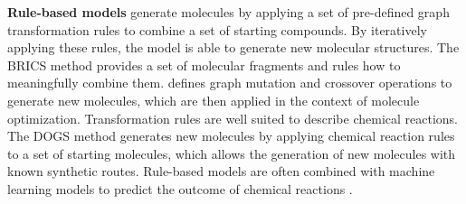 \textbf{Rule-based models} generate molecules by applying a set of pre-defined graph transformation
rules to combine a set of starting compounds. By iteratively applying these rules, the model is able
to generate new molecular structures. The BRICS \citep{degenArtCompilingUsing2008} method provides a
set of molecular fragments and rules how to meaningfully combine them.
\citet{jensenGraphbasedGeneticAlgorithm2019} defines graph mutation and crossover operations to
generate new molecules, which are then applied in the context of molecule optimization.
Transformation rules are well suited to describe chemical reactions. The DOGS method
\citep{hartenfellerDOGSReactionDrivenNovo2012} generates new molecules by applying chemical reaction
rules to a set of starting molecules, which allows the generation of new molecules with known
synthetic routes. Rule-based models are often combined with machine learning models to predict the
outcome of chemical reactions
\citep{seglerNeuralSymbolicMachineLearning2017,seglerPlanningChemicalSyntheses2018,fortunatoDataAugmentationPretraining2020}.


